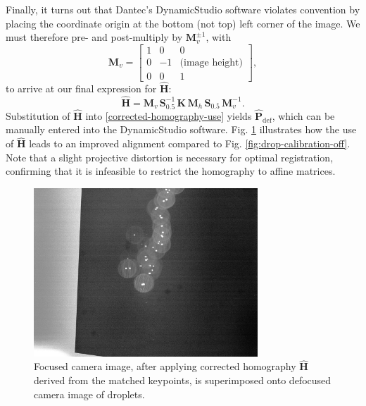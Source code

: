 \documentclass[preprint]{elsarticle}
\begin{document}
Finally, it turns out that Dantec's DynamicStudio software violates convention
by placing the coordinate origin at the bottom (not top) left corner of the
image. We must therefore pre- and post-multiply by $\mathbf{M}_v^{\pm 1}$, with
\begin{equation*}
    \mathbf{M}_v = \left[ \begin{array}{ccc}
            1 & 0 & 0 \\
    0 & -1 & \text{(image height)} \\
            0 & 0 & 1
    \end{array} \right],
\end{equation*}
to arrive at our final expression for $\mathbf{\hat{H}}$:
\begin{equation}
    \mathbf{\hat{H}} = \mathbf{M}_v\, \mathbf{S}_{0.5}^{-1}\, \mathbf{K}\,
    \mathbf{M}_h\, \mathbf{S}_{0.5}\, \mathbf{M}_v^{-1}.
\end{equation}
Substitution of $\mathbf{\hat{H}}$ into \eqref{corrected-homography-use} yields
$\mathbf{\hat{P}}_\text{def}$, which can be manually entered into the
DynamicStudio software. Fig. \ref{fig:drop-calibration-corrected} illustrates
how the use of $\mathbf{\hat{H}}$ leads to an improved alignment compared to
Fig. \ref{fig:drop-calibration-off}. Note that a slight projective distortion
is necessary for optimal registration, confirming that it is infeasible to restrict the homography
to affine matrices.

\begin{figure}
    \centering
    \includegraphics[width=0.75\textwidth]{orb_images/drop-calibration-corrected.jpg}
    \caption{Focused camera image, after applying corrected homography
        $\mathbf{\hat{H}}$ derived from the matched keypoints, is superimposed onto
    defocused camera image of droplets.}
    \label{fig:drop-calibration-corrected}
\end{figure}
\end{document}
